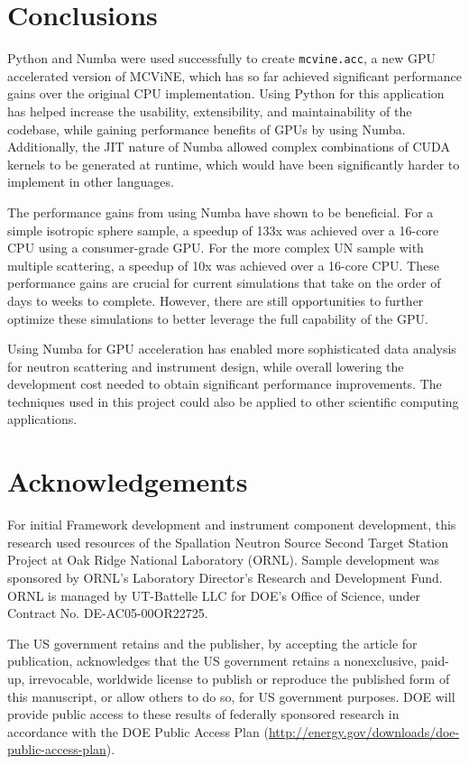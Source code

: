 \section{Conclusions}

Python and Numba were used successfully to create \texttt{mcvine.acc}, a new GPU accelerated version of MCViNE, which has so far achieved significant performance gains over the original CPU implementation. Using Python for this application has helped increase the usability, extensibility, and maintainability of the codebase, while gaining performance benefits of GPUs by using Numba. Additionally, the JIT nature of Numba allowed complex combinations of CUDA kernels to be generated at runtime, which would have been significantly harder to implement in other languages.

The performance gains from using Numba have shown to be beneficial. For a simple isotropic sphere sample, a speedup of 133x was achieved over a 16-core CPU using a consumer-grade GPU. For the more complex UN sample with multiple scattering, a speedup of 10x was achieved over a 16-core CPU. These performance gains are crucial for current simulations that take on the order of days to weeks to complete. However, there are still opportunities to further optimize these simulations to better leverage the full capability of the GPU. 

Using Numba for GPU acceleration has enabled more sophisticated data analysis for neutron scattering and instrument design, while overall lowering the development cost needed to obtain significant performance improvements. The techniques used in this project could also be applied to other scientific computing applications.


\section{Acknowledgements}
For initial Framework development and instrument component development, this research used resources of the Spallation Neutron Source Second Target Station Project at Oak Ridge National Laboratory (ORNL). Sample development was sponsored by ORNL's Laboratory Director's Research and Development Fund. ORNL is managed by UT-Battelle LLC for DOE’s Office of Science, under Contract No. DE-AC05-00OR22725.

The US government retains and the publisher, by accepting the article for publication, acknowledges that the US government retains a nonexclusive, paid-up, irrevocable, worldwide license to publish or reproduce the published form of this manuscript, or allow others to do so, for US government purposes. DOE will provide public access to these results of federally sponsored research in accordance with the DOE Public Access Plan (\url{http://energy.gov/downloads/doe-public-access-plan}).
